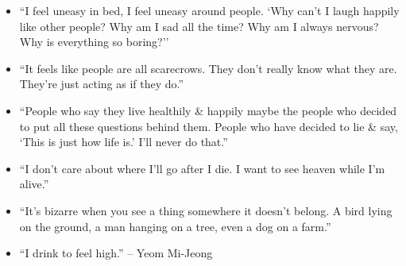 \documentclass{article}
\begin{document}
\begin{enumerate}
\begin{itemize}
		\item ``I feel uneasy in bed, I feel uneasy around people. `Why can't I laugh happily like other people? Why am I sad all the time? Why am I always nervous? Why is everything so boring?''
		\item ``It feels like people are all scarecrows. They don't really know what they are. They're just acting as if they do.''
		\item ``People who say they live healthily \& happily maybe the people who decided to put all these questions behind them. People who have decided to lie \& say, `This is just how life is.' I'll never do that.''
		\item ``I don't care about where I'll go after I die. I want to see heaven while I'm alive.''
		\item ``It's bizarre when you see a thing somewhere it doesn't belong. A bird lying on the ground, a man hanging on a tree, even a dog on a farm.''
		\item ``I drink to feel high.'' -- Yeom Mi-Jeong


\end{itemize}
\end{enumerate}
\end{document}
